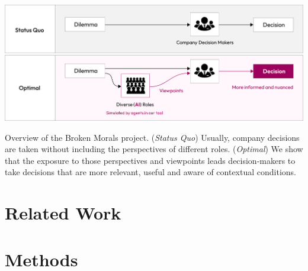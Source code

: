 \documentclass[sigconf, authorversion, nonacm, screen]{acmart}
\begin{document}
\begin{teaserfigure}
  \includegraphics[width=\textwidth]{teaser}
  \caption{Overview of the Broken Morals project. (\textit{Status Quo}) Usually, company decisions are taken without including the perspectives of different roles. (\textit{Optimal}) We show that the exposure to those perspectives and viewpoints leads decision-makers to take decisions that are more relevant, useful and aware of contextual conditions.}
  \label{fig:teaser}
\end{teaserfigure}

\maketitle

\section{Related Work}



\section{Methods}
\end{document}
